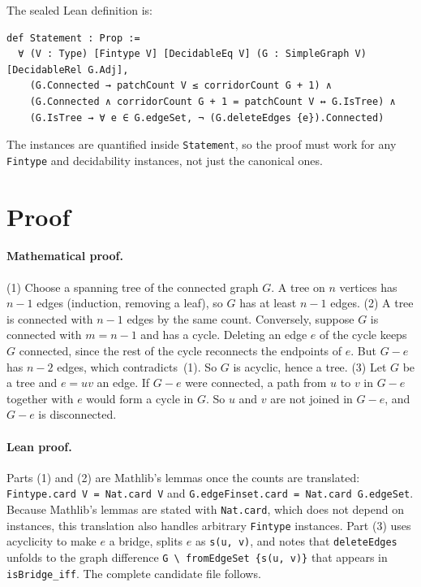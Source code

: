 \documentclass[11pt]{article}
\begin{document}
The sealed Lean definition is:
\begin{lstlisting}
def Statement : Prop :=
  ∀ (V : Type) [Fintype V] [DecidableEq V] (G : SimpleGraph V) [DecidableRel G.Adj],
    (G.Connected → patchCount V ≤ corridorCount G + 1) ∧
    (G.Connected ∧ corridorCount G + 1 = patchCount V ↔ G.IsTree) ∧
    (G.IsTree → ∀ e ∈ G.edgeSet, ¬ (G.deleteEdges {e}).Connected)
\end{lstlisting}
The instances are quantified inside \texttt{Statement}, so the proof must work for any
\texttt{Fintype} and decidability instances, not just the canonical ones.

\section{Proof}
\paragraph{Mathematical proof.} (1) Choose a spanning tree of the connected graph $G$. A tree on $n$
vertices has $n-1$ edges (induction, removing a leaf), so $G$ has at least $n-1$ edges.
(2) A tree is connected with $n-1$ edges by the same count. Conversely, suppose $G$ is connected with
$m=n-1$ and has a cycle. Deleting an edge $e$ of the cycle keeps $G$ connected, since the rest of the
cycle reconnects the endpoints of $e$. But $G-e$ has $n-2$ edges, which contradicts~(1). So $G$ is
acyclic, hence a tree.
(3) Let $G$ be a tree and $e=uv$ an edge. If $G-e$ were connected, a path from $u$ to $v$ in $G-e$
together with $e$ would form a cycle in $G$. So $u$ and $v$ are not joined in $G-e$, and $G-e$ is
disconnected.

\paragraph{Lean proof.} Parts (1) and (2) are Mathlib's lemmas once the counts are translated:
\texttt{Fintype.card V = Nat.card V} and \texttt{G.edgeFinset.card = Nat.card G.edgeSet}. Because
Mathlib's lemmas are stated with \texttt{Nat.card}, which does not depend on instances, this translation
also handles arbitrary \texttt{Fintype} instances. Part (3) uses acyclicity to make $e$ a bridge, splits
$e$ as \texttt{s(u, v)}, and notes that \texttt{deleteEdges} unfolds to the graph difference
\texttt{G \textbackslash{} fromEdgeSet \{s(u, v)\}} that appears in \texttt{isBridge\_iff}. The complete
candidate file follows.
\end{document}
